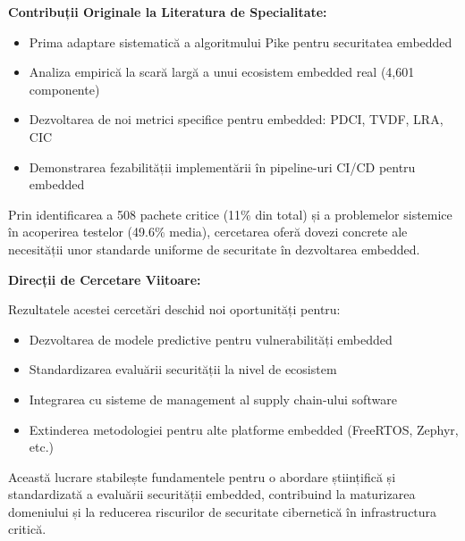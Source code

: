 \documentclass[12pt,a4paper]{article}
\begin{document}
\textbf{Contribuții Originale la Literatura de Specialitate:}

\begin{itemize}
\item Prima adaptare sistematică a algoritmului Pike pentru securitatea embedded
\item Analiza empirică la scară largă a unui ecosistem embedded real (4,601 componente)
\item Dezvoltarea de noi metrici specifice pentru embedded: PDCI, TVDF, LRA, CIC
\item Demonstrarea fezabilității implementării în pipeline-uri CI/CD pentru embedded
\end{itemize}

Prin identificarea a 508 pachete critice (11\% din total) și a problemelor sistemice în acoperirea testelor (49.6\% media), cercetarea oferă dovezi concrete ale necesității unor standarde uniforme de securitate în dezvoltarea embedded.

\textbf{Direcții de Cercetare Viitoare:}

Rezultatele acestei cercetări deschid noi oportunități pentru:
\begin{itemize}
\item Dezvoltarea de modele predictive pentru vulnerabilități embedded
\item Standardizarea evaluării securității la nivel de ecosistem
\item Integrarea cu sisteme de management al supply chain-ului software
\item Extinderea metodologiei pentru alte platforme embedded (FreeRTOS, Zephyr, etc.)
\end{itemize}

Această lucrare stabilește fundamentele pentru o abordare științifică și standardizată a evaluării securității embedded, contribuind la maturizarea domeniului și la reducerea riscurilor de securitate cibernetică în infrastructura critică.

\newpage

\printbibliography[heading=bibintoc, title={Bibliografie}]
\end{document}
